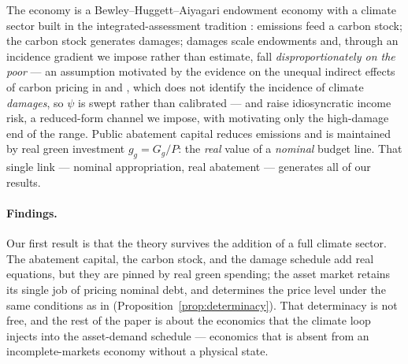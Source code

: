 \documentclass[12pt]{article}
\begin{document}
The economy is a Bewley--Huggett--Aiyagari endowment economy
\citep{bewley1980,huggett1993,aiyagari1994} with a climate sector built in the
integrated-assessment tradition \citep{golosov2014,nordhaus2017}: emissions
feed a carbon stock; the carbon stock generates damages; damages scale
endowments and, through an incidence gradient we impose rather than
estimate, fall \emph{disproportionately on the poor} --- an assumption
motivated by the evidence on the unequal indirect effects of carbon pricing
in \citet{kanzig2023carbon} and \citet{fried2018}, which does not identify
the incidence of climate \emph{damages}, so $\psi$ is swept rather than
calibrated --- and raise idiosyncratic income risk, a reduced-form channel we
impose, with \citet{bilalkanzig2024} motivating only the high-damage end of
the range. Public abatement capital
reduces emissions and is maintained by real green investment
$g_g = G_g/P$: the \emph{real} value of a \emph{nominal} budget line. That
single link --- nominal appropriation, real abatement --- generates all of our
results.

\paragraph{Findings.} Our first result is that the theory survives the
addition of a full climate sector. The abatement capital, the carbon stock,
and the damage schedule add real equations, but they are pinned by real green
spending; the asset market retains its single job of pricing nominal debt, and
determines the price level under the same conditions as in
\citet{hagedorn2026dtpl} (Proposition~\ref{prop:determinacy}). That
determinacy is not free, and the rest of the paper is about the economics that
the climate loop injects into the asset-demand schedule --- economics that
is absent from an incomplete-markets economy without a physical state.
\end{document}
